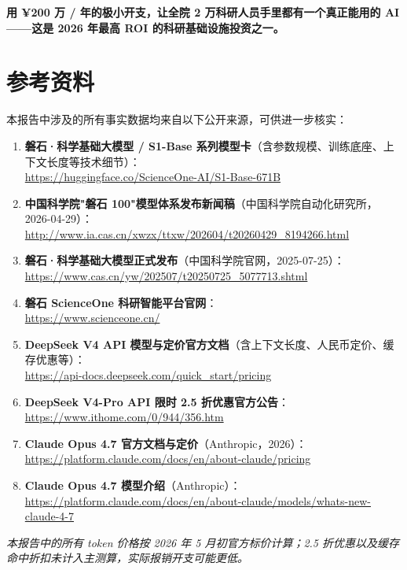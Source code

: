\vspace{4pt}
\begin{tcolorbox}[colback=primary,coltext=white,colframe=primary,boxrule=0pt,
                  arc=2pt,left=14pt,right=14pt,top=12pt,bottom=12pt]
\sffamily\Large\bfseries
用 ¥200 万 / 年的极小开支，让全院 2 万科研人员手里都有一个真正能用的 AI——这是 2026 年最高 ROI 的科研基础设施投资之一。
\end{tcolorbox}

\appendix
\section{参考资料}
\label{sec:references}

本报告中涉及的所有事实数据均来自以下公开来源，可供进一步核实：

\medskip
\begin{enumerate}[leftmargin=22pt]
\item \textbf{磐石·科学基础大模型 / S1-Base 系列模型卡}（含参数规模、训练底座、上下文长度等技术细节）：\\
\url{https://huggingface.co/ScienceOne-AI/S1-Base-671B}

\item \textbf{中国科学院"磐石 100"模型体系发布新闻稿}（中国科学院自动化研究所，2026-04-29）：\\
\url{http://www.ia.cas.cn/xwzx/ttxw/202604/t20260429_8194266.html}

\item \textbf{磐石·科学基础大模型正式发布}（中国科学院官网，2025-07-25）：\\
\url{https://www.cas.cn/yw/202507/t20250725_5077713.shtml}

\item \textbf{磐石 ScienceOne 科研智能平台官网}：\\
\url{https://www.scienceone.cn/}

\item \textbf{DeepSeek V4 API 模型与定价官方文档}（含上下文长度、人民币定价、缓存优惠等）：\\
\url{https://api-docs.deepseek.com/quick_start/pricing}

\item \textbf{DeepSeek V4-Pro API 限时 2.5 折优惠官方公告}：\\
\url{https://www.ithome.com/0/944/356.htm}

\item \textbf{Claude Opus 4.7 官方文档与定价}（Anthropic，2026）：\\
\url{https://platform.claude.com/docs/en/about-claude/pricing}

\item \textbf{Claude Opus 4.7 模型介绍}（Anthropic）：\\
\url{https://platform.claude.com/docs/en/about-claude/models/whats-new-claude-4-7}
\end{enumerate}

\bigskip
\textit{本报告中的所有 token 价格按 2026 年 5 月初官方标价计算；2.5 折优惠以及缓存命中折扣未计入主测算，实际报销开支可能更低。}
